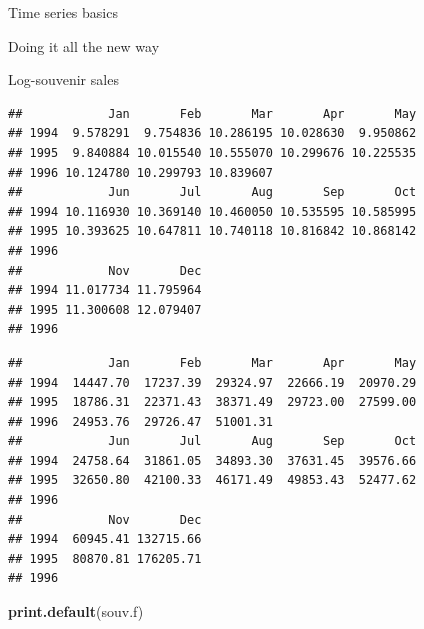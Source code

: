 \documentclass[ignorenonframetext,]{beamer}
\newenvironment{Shaded}{\begin{snugshade}}{\end{snugshade}}
\newcommand{\KeywordTok}[1]{\textcolor[rgb]{0.13,0.29,0.53}{\textbf{#1}}}
\newcommand{\NormalTok}[1]{#1}
\newcommand{\OperatorTok}[1]{\textcolor[rgb]{0.81,0.36,0.00}{\textbf{#1}}}
\begin{document}
\begin{frame}[fragile]{Time series basics}
\begin{block}{Doing it all the new way}
\begin{block}{Log-souvenir sales}
\begin{Shaded}
\end{Shaded}

\begin{verbatim}
##            Jan       Feb       Mar       Apr       May
## 1994  9.578291  9.754836 10.286195 10.028630  9.950862
## 1995  9.840884 10.015540 10.555070 10.299676 10.225535
## 1996 10.124780 10.299793 10.839607                    
##            Jun       Jul       Aug       Sep       Oct
## 1994 10.116930 10.369140 10.460050 10.535595 10.585995
## 1995 10.393625 10.647811 10.740118 10.816842 10.868142
## 1996                                                  
##            Nov       Dec
## 1994 11.017734 11.795964
## 1995 11.300608 12.079407
## 1996
\end{verbatim}

\begin{Shaded}
\end{Shaded}

\begin{verbatim}
##            Jan       Feb       Mar       Apr       May
## 1994  14447.70  17237.39  29324.97  22666.19  20970.29
## 1995  18786.31  22371.43  38371.49  29723.00  27599.00
## 1996  24953.76  29726.47  51001.31                    
##            Jun       Jul       Aug       Sep       Oct
## 1994  24758.64  31861.05  34893.30  37631.45  39576.66
## 1995  32650.80  42100.33  46171.49  49853.43  52477.62
## 1996                                                  
##            Nov       Dec
## 1994  60945.41 132715.66
## 1995  80870.81 176205.71
## 1996
\end{verbatim}

\begin{Shaded}
\begin{Highlighting}[]
\KeywordTok{print.default}\NormalTok{(souv.f)}
\end{Highlighting}
\end{Shaded}


\end{block}
\end{block}
\end{frame}
\end{document}
